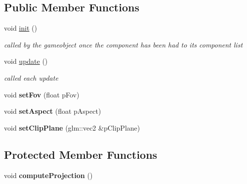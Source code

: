 \subsection*{\-Public \-Member \-Functions}
\begin{DoxyCompactItemize}
\item 
\hypertarget{classde_1_1component_1_1_camera_a2ef98cdce449ec142368b235bd235e5b}{
void \hyperlink{classde_1_1component_1_1_camera_a2ef98cdce449ec142368b235bd235e5b}{init} ()}
\label{classde_1_1component_1_1_camera_a2ef98cdce449ec142368b235bd235e5b}

\begin{DoxyCompactList}\small\item\em called by the gameobject once the component has been had to its component list \end{DoxyCompactList}\item 
\hypertarget{classde_1_1component_1_1_camera_a2f014c4f6467735c3e527f26fbb95c90}{
void \hyperlink{classde_1_1component_1_1_camera_a2f014c4f6467735c3e527f26fbb95c90}{update} ()}
\label{classde_1_1component_1_1_camera_a2f014c4f6467735c3e527f26fbb95c90}

\begin{DoxyCompactList}\small\item\em called each update \end{DoxyCompactList}\item 
\hypertarget{classde_1_1component_1_1_camera_a3d5829322081062984cfef94f4ac4f14}{
void {\bfseries set\-Fov} (float p\-Fov)}
\label{classde_1_1component_1_1_camera_a3d5829322081062984cfef94f4ac4f14}

\item 
\hypertarget{classde_1_1component_1_1_camera_af5579f5f972add9e50cd112678c67445}{
void {\bfseries set\-Aspect} (float p\-Aspect)}
\label{classde_1_1component_1_1_camera_af5579f5f972add9e50cd112678c67445}

\item 
\hypertarget{classde_1_1component_1_1_camera_a798de6d6cc71f7102937e98e4c06fd9c}{
void {\bfseries set\-Clip\-Plane} (glm\-::vec2 \&p\-Clip\-Plane)}
\label{classde_1_1component_1_1_camera_a798de6d6cc71f7102937e98e4c06fd9c}

\end{DoxyCompactItemize}
\subsection*{\-Protected \-Member \-Functions}
\begin{DoxyCompactItemize}
\item 
\hypertarget{classde_1_1component_1_1_camera_a86423dc08e6d56abeea66fc805d43048}{
void {\bfseries compute\-Projection} ()}
\label{classde_1_1component_1_1_camera_a86423dc08e6d56abeea66fc805d43048}

\end{DoxyCompactItemize}
